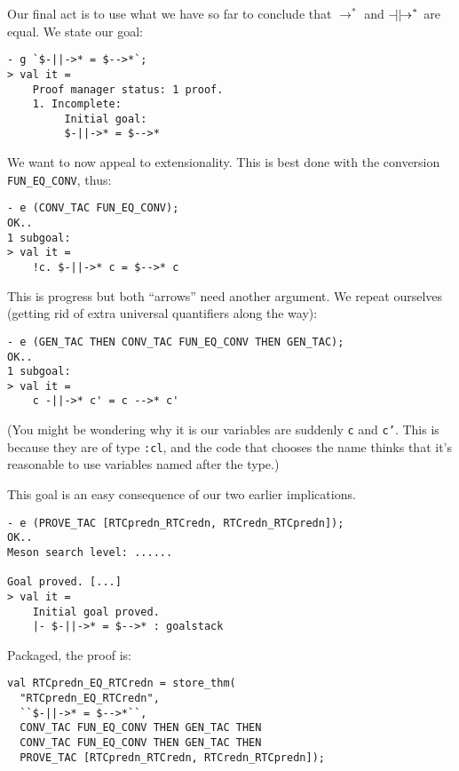 Our final act is to use what we have so far to conclude that
$\rightarrow^*$ and $\mathbin{-\!\!\!\mid\mid\!\rightarrow}^*$ are equal.  We state our goal:
\begin{session}\begin{verbatim}
- g `$-||->* = $-->*`;
> val it =
    Proof manager status: 1 proof.
    1. Incomplete:
         Initial goal:
         $-||->* = $-->*
\end{verbatim}\end{session}
We want to now appeal to extensionality.  This is best done with the
conversion \texttt{FUN\_EQ\_CONV}, thus:
\begin{session}\begin{verbatim}
- e (CONV_TAC FUN_EQ_CONV);
OK..
1 subgoal:
> val it =
    !c. $-||->* c = $-->* c
\end{verbatim}\end{session}
This is progress but both ``arrows'' need another argument.  We repeat
ourselves (getting rid of extra universal quantifiers along the way):
\begin{session}\begin{verbatim}
- e (GEN_TAC THEN CONV_TAC FUN_EQ_CONV THEN GEN_TAC);
OK..
1 subgoal:
> val it =
    c -||->* c' = c -->* c'
\end{verbatim}\end{session}
(You might be wondering why it is our variables are suddenly
\texttt{c} and \texttt{c'}.  This is because they are of type
\texttt{:cl}, and the code that chooses the name thinks that it's
reasonable to use variables named after the type.)

This goal is an easy consequence of our two earlier implications.
\begin{session}\begin{verbatim}
- e (PROVE_TAC [RTCpredn_RTCredn, RTCredn_RTCpredn]);
OK..
Meson search level: ......

Goal proved. [...]
> val it =
    Initial goal proved.
    |- $-||->* = $-->* : goalstack
\end{verbatim}\end{session}
Packaged, the proof is:
\begin{session}\begin{verbatim}
val RTCpredn_EQ_RTCredn = store_thm(
  "RTCpredn_EQ_RTCredn",
  ``$-||->* = $-->*``,
  CONV_TAC FUN_EQ_CONV THEN GEN_TAC THEN
  CONV_TAC FUN_EQ_CONV THEN GEN_TAC THEN
  PROVE_TAC [RTCpredn_RTCredn, RTCredn_RTCpredn]);
\end{verbatim}\end{session}


